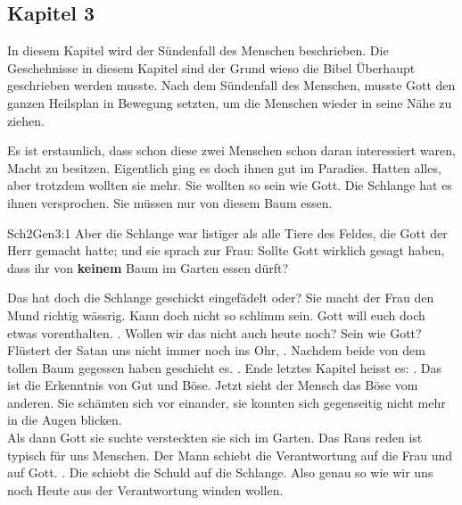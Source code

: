 \subsection{Kapitel 3}
In diesem Kapitel wird der Sündenfall des Menschen beschrieben. Die Geschehnisse in diesem Kapitel sind der Grund wieso die Bibel Überhaupt geschrieben werden musste. Nach dem Sündenfall des Menschen, musste Gott den ganzen Heilsplan in Bewegung setzten, um die Menschen wieder in seine Nähe zu ziehen.

Es ist erstaunlich, dass schon diese zwei Menschen schon daran interessiert waren, Macht zu besitzen. Eigentlich ging es doch ihnen gut im Paradies. Hatten alles, aber trotzdem wollten sie mehr. Sie wollten so sein wie Gott. Die Schlange hat es ihnen versprochen. Sie müssen nur von diesem Baum essen.
\begin{bibeltext}{Sch2}{Gen}{3:1}
	Aber die Schlange war listiger als alle Tiere des Feldes, die Gott der Herr gemacht hatte; und sie sprach zur Frau: Sollte Gott wirklich gesagt haben, dass ihr von \textbf{keinem} Baum im Garten essen dürft?
\end{bibeltext}
Das hat doch die Schlange geschickt eingefädelt oder? Sie macht der Frau den Mund richtig wässrig. Kann doch nicht so schlimm sein. Gott will euch doch etwas vorenthalten. . Wollen wir das nicht auch heute noch? Sein wie Gott? Flüstert der Satan uns nicht immer noch ins Ohr, .
Nachdem beide von dem tollen Baum gegessen haben geschieht es. . Ende letztes Kapitel heisst es: . Das ist die Erkenntnis von Gut und Böse. Jetzt sieht der Mensch das Böse vom anderen. Sie schämten sich vor einander, sie konnten sich gegenseitig nicht mehr in die Augen blicken.\\
Als dann Gott sie suchte versteckten sie sich im Garten. Das Raus reden ist typisch für uns Menschen. Der Mann schiebt die Verantwortung auf die Frau und auf Gott. . Die schiebt die Schuld auf die Schlange. Also genau so wie wir uns noch Heute aus der Verantwortung winden wollen.

